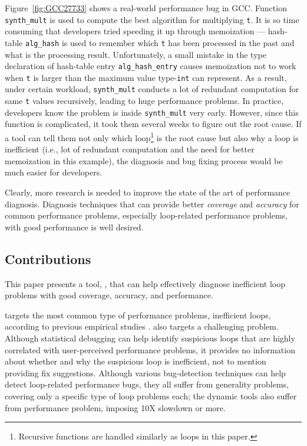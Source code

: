 Figure~\ref{fig:GCC27733} shows a real-world performance bug in GCC. 
Function \texttt{synth\_mult} is used to compute the best algorithm for 
multiplying \texttt{t}. It is so time consuming that developers tried 
speeding it up through memoization ---
hash-table
\texttt{alg\_hash} is used to remember which \texttt{t} has been processed
in the past and what is the processing result. 
Unfortunately, a small mistake in the type declaration of hash-table
entry \texttt{alg\_hash\_entry} causes memoization not to work when \texttt{t}
is larger than the maximum value type-\texttt{int} can represent.
As a result, under certain workload, \texttt{synth\_mult} conducts a lot of
redundant computation for same \texttt{t} values recursively, leading to
huge performance problems.  In practice, developers know the problem is inside
\texttt{synth\_mult} very early. However, since this function is 
complicated, it took them several weeks to figure out the root cause. 
If a tool can tell them not only which loop\footnote{Recursive functions are
handled similarly as loops in this paper.}
is the root cause but also why a loop is inefficient (i.e., lot of redundant
computation and the need for better memoization in this example), 
the diagnosis and bug fixing
process would be much easier for developers. 

Clearly, more research is needed to improve the state of the art of performance
diagnosis. Diagnosis techniques that can provide better
\textit{coverage} and \textit{accuracy} for common performance problems,
especially loop-related performance problems, with good
performance is well desired.


\subsection{Contributions}
This paper presents a tool, \Tool, that can help effectively diagnose
inefficient loop problems with good coverage, accuracy, and performance.

\Tool targets the most common type of performance problems, inefficient
loops, according to previous
empirical studies \cite{SongOOPSLA2014,PerfBug}.
\Tool also targets a challenging problem. Although
statistical debugging \cite{SongOOPSLA2014}
can help identify suspicious loops that are highly correlated with 
user-perceived performance problems,
it provides no information about whether and why 
the suspicious loop is inefficient,
not to mention providing fix suggestions. Although various
bug-detection techniques \cite{Cachetor,Alabama,CARAMEL} can help detect
loop-related performance bugs, they all suffer from generality problems,
covering only a specific type of loop problems each; the dynamic
tools \cite{Cachetor,Alabama} also suffer from performance
problem, imposing 10X slowdown or more.

